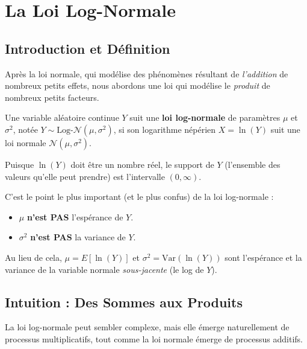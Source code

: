 \newpage
\section{La Loi Log-Normale}

\subsection{Introduction et Définition}

Après la loi normale, qui modélise des phénomènes résultant de \textit{l'addition} de nombreux petits effets, nous abordons une loi qui modélise le \textit{produit} de nombreux petits facteurs.

\begin{definitionbox}
Une variable aléatoire continue $Y$ suit une \textbf{loi log-normale} de paramètres $\mu$ et $\sigma^2$, notée $Y \sim \text{Log-}\mathcal{N}(\mu, \sigma^2)$, si son logarithme népérien $X = \ln(Y)$ suit une loi normale $\mathcal{N}(\mu, \sigma^2)$.

Puisque $\ln(Y)$ doit être un nombre réel, le support de $Y$ (l'ensemble des valeurs qu'elle peut prendre) est l'intervalle $(0, \infty)$.
\end{definitionbox}

\begin{remarquebox}
C'est le point le plus important (et le plus confus) de la loi log-normale :
\begin{itemize}
    \item $\mu$ \textbf{n'est PAS} l'espérance de $Y$.
    \item $\sigma^2$ \textbf{n'est PAS} la variance de $Y$.
\end{itemize}
Au lieu de cela, $\mu = E[\ln(Y)]$ et $\sigma^2 = \text{Var}(\ln(Y))$ sont l'espérance et la variance de la variable normale \textit{sous-jacente} (le log de $Y$).
\end{remarquebox}

\subsection{Intuition : Des Sommes aux Produits}

La loi log-normale peut sembler complexe, mais elle émerge naturellement de processus multiplicatifs, tout comme la loi normale émerge de processus additifs.

